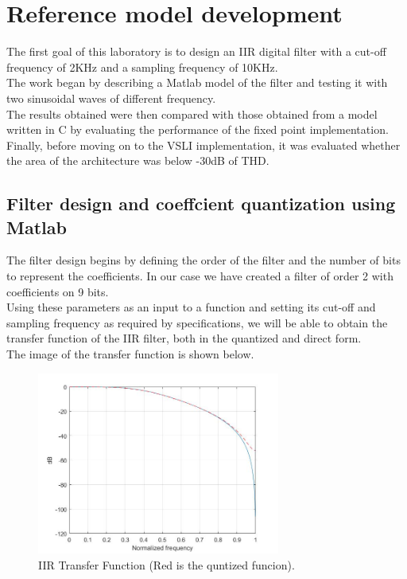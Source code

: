 \section{Reference model development}

The first goal of this laboratory is to design an IIR digital filter with a cut-off frequency of 2KHz and a sampling frequency of 10KHz.\\
The work began by describing a Matlab model of the filter and testing it with two sinusoidal waves of different frequency.\\
The results obtained were then compared with those obtained from a model written in C by evaluating the performance of the fixed point implementation.\\
Finally, before moving on to the VSLI implementation, it was evaluated whether the area of the architecture was below -30dB of THD.

\subsection{Filter design and coeffcient quantization using Matlab}

The filter design begins by defining the order of the filter and the number of bits to represent the coefficients.
In our case we have created a filter of order 2 with coefficients on 9 bits.\\
Using these parameters as an input to a function and setting its cut-off and sampling frequency as required by specifications, we will be able to obtain the transfer function of the IIR filter, both in the quantized and direct form.\\
The image of the transfer function is shown below.\\

\begin{figure}[H]
	\centering
	\includegraphics[width=8cm, height=6cm]{img/transfer_func.jpg} 
	\caption{IIR Transfer Function (Red is the quntized funcion).}
	\label{fig:IIR Transfer Function} 
\end{figure}

